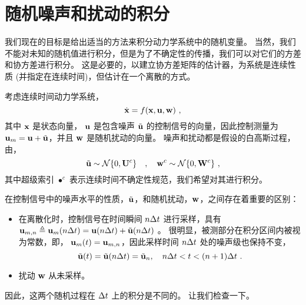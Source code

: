 
\section{随机噪声和扰动的积分}
\label{sec:IntNoise}

我们现在的目标是给出适当的方法来积分动力学系统中的随机变量。 
当然，我们不能对未知的随机值进行积分，但是为了不确定性的传播，我们可以对它们的方差和协方差进行积分。 
这是必要的，以建立协方差矩阵的估计器，为系统是连续性质 (并指定在连续时间)，但估计在一个离散的方式。

考虑连续时间动力学系统，
%
\begin{equation}
\dot{{\bf x}} = f({\bf x},{\bf u},{\bf w})~,
\label{equ:contSysWithNoise}
\end{equation}
%
其中 ${\bf x}$ 是状态向量， ${\bf u}$ 是包含噪声 $\tilde{{\bf u}}$ 的控制信号的向量，因此控制测量为 ${\bf u}_m={\bf u}+\tilde{{\bf u}}$，并且 ${\bf w}$ 是随机扰动的向量。 
噪声和扰动都是假设的白高斯过程，由，
%
\begin{equation}
\tilde{{\bf u}} \sim \mathcal{N}\{0,{\bf U}^c\} \quad , \quad {\bf w}^c\sim\mathcal{N}\{0,{\bf W}^c\}~,
\end{equation}
%
其中超级索引 $\bullet^c$ 表示连续时间不确定性规范，我们希望对其进行积分。

在控制信号中的噪声水平的性质，$\tilde{{\bf u}}$，和随机扰动，${\bf w}$，之间存在着重要的区别：
%
\begin{itemize}
\item 
在离散化时，控制信号在时间瞬间 $n\Delta t$ 进行采样，具有 ${\bf u}_{m,n}\triangleq{\bf u}_m(n\Delta t)={\bf u}(n\Delta t)+\tilde{{\bf u}}(n\Delta t)$ 。
很明显，被测部分在积分区间内被视为常数，即， ${\bf u}_m(t)={\bf u}_{m,n}$，因此采样时间 $n\Delta t$ 处的噪声级也保持不变，
%
\begin{equation}
\tilde{{\bf u}}(t)=\tilde{{\bf u}}(n\Delta t) = \tilde{{\bf u}}_n, \quad n\Delta t<t<(n+1)\Delta t~. \label{equ:uint}
\end{equation}
%
\item  
扰动 ${\bf w}$ 从未采样。 

\end{itemize}
%


因此，这两个随机过程在 $\Delta t$ 上的积分是不同的。 
让我们检查一下。 

